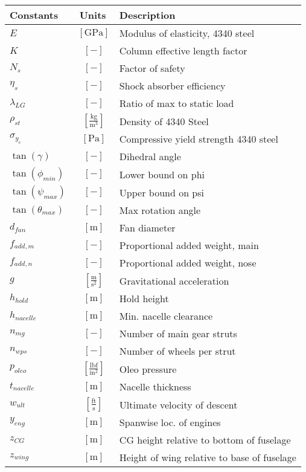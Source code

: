 % 

{\footnotesize
\begin{supertabular}{lcl}
\toprule
Constants & Units & Description \\ \midrule
$E$ & $~\mathrm{[GPa]}$ & Modulus of elasticity, 4340 steel \\
$K$ & $~[-]$ & Column effective length factor \\
$N_s$ & $~[-]$ & Factor of safety \\
$\eta_s$ & $~[-]$ & Shock absorber efficiency \\
$\lambda_{LG}$ & $~[-]$ & Ratio of max to static load \\
$\rho_{st}$ & $~\mathrm{[\tfrac{kg}{m^{3}}]}$ & Density of 4340 Steel \\
$\sigma_{y_c}$ & $~\mathrm{[Pa]}$ & Compressive yield strength 4340 steel \\
$\tan(\gamma)$ & $~[-]$ & Dihedral angle \\
$\tan(\phi_{min})$ & $~[-]$ & Lower bound on phi \\
$\tan(\psi_{max})$ & $~[-]$ & Upper bound on psi \\
$\tan(\theta_{max})$ & $~[-]$ & Max rotation angle \\
$d_{fan}$ & $~\mathrm{[m]}$ & Fan diameter \\
$f_{add,m}$ & $~[-]$ & Proportional added weight, main \\
$f_{add,n}$ & $~[-]$ & Proportional added weight, nose \\
$g$ & $~\mathrm{[\tfrac{m}{s^{2}}]}$ & Gravitational acceleration \\
$h_{hold}$ & $~\mathrm{[m]}$ & Hold height \\
$h_{nacelle}$ & $~\mathrm{[m]}$ & Min. nacelle clearance \\
$n_{mg}$ & $~[-]$ & Number of main gear struts \\
$n_{wps}$ & $~[-]$ & Number of wheels per strut \\
$p_{oleo}$ & $~\mathrm{[\tfrac{lbf}{in^{2}}]}$ & Oleo pressure \\
$t_{nacelle}$ & $~\mathrm{[m]}$ & Nacelle thickness \\
$w_{ult}$ & $~\mathrm{[\tfrac{ft}{s}]}$ & Ultimate velocity of descent \\
$y_{eng}$ & $~\mathrm{[m]}$ & Spanwise loc. of engines \\
$z_{CG}$ & $~\mathrm{[m]}$ & CG height relative to bottom of fuselage \\
$z_{wing}$ & $~\mathrm{[m]}$ & Height of wing relative to base of fuselage \\
\bottomrule
\end{supertabular}}

% 